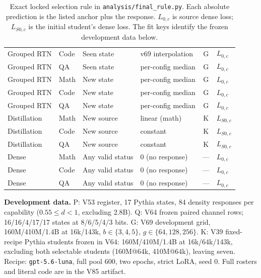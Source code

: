 \begin{table}[H]
\begin{tabular}{@{}llllcl@{}}
Grouped RTN & Code & Seen state & v69 interpolation & G & $L_{0,c}$ \\
Grouped RTN & QA & Seen state & per-config median & G & $L_{0,c}$ \\
Grouped RTN & Math & New state & per-config median & G & $L_{0,c}$ \\
Grouped RTN & Code & New state & per-config median & G & $L_{0,c}$ \\
Grouped RTN & QA & New state & per-config median & G & $L_{0,c}$ \\
\addlinespace
Distillation & Math & New source & linear (math) & K & $L_{S0,c}$ \\
Distillation & Code & New source & constant & K & $L_{S0,c}$ \\
Distillation & QA & New source & constant & K & $L_{S0,c}$ \\
\addlinespace
Dense & Math & Any valid status & 0 (no response) & --- & $L_{0,c}$ \\
Dense & Code & Any valid status & 0 (no response) & --- & $L_{0,c}$ \\
Dense & QA & Any valid status & 0 (no response) & --- & $L_{0,c}$ \\
\bottomrule
\end{tabular}
\caption{Exact locked selection rule in \texttt{analysis/final\_rule.py}. Each absolute prediction is the listed anchor plus the response. $L_{0,c}$ is source dense loss; $L_{S0,c}$ is the initial student's dense loss. The fit keys identify the frozen development data below.}
\label{tab:locked_rule}
\end{table}
\begingroup\small
\noindent\textbf{Development data.} P: V53 register, 17 Pythia states, 84 density responses per capability ($0.55\le d<1$, excluding 2.8B). Q: V64 frozen paired channel rows; 16/16/4/17/17 states at 8/6/5/4/3 bits. G: V69 development grid, 160M/410M/1.4B at 16k/143k, $b\in\{3,4,5\}$, $g\in\{64,128,256\}$. K: V39 fixed-recipe Pythia students frozen in V64: 160M/410M/1.4B at 16k/64k/143k, excluding both selectable students (160M@64k, 410M@64k), leaving seven. Recipe: \texttt{gpt-5.6-luna}, full pool 600, two epochs, strict LoRA, seed 0. Full rosters and literal code are in the V85 artifact.
